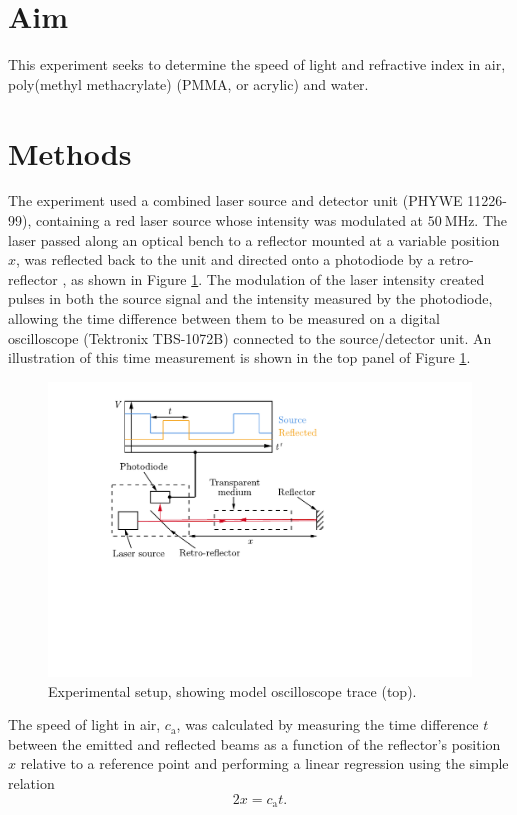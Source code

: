 \documentclass[
    aps,
    prl,
    reprint,
    10pt,
    amsmath,
    amssymb,
    a4paper,
    longbibliography
]{revtex4-2}
\begin{document}
\section{Aim}

This experiment seeks to determine the speed of light and refractive
index in air, poly(methyl methacrylate) (PMMA, or acrylic) and water.


\section{Methods}

The experiment used a combined laser source and detector unit
(PHYWE 11226-99), containing a red laser source whose intensity was
modulated at $\SI{50}{\mega\hertz}$. The laser passed along an optical
bench to a reflector mounted at a variable position $x$, was reflected
back to the unit and directed onto a photodiode by a retro-reflector
\cite{datasheet}, as shown in Figure \ref{setup}.
The modulation of the laser intensity created pulses in
both the source signal and the intensity measured by the photodiode,
allowing the time difference between them to be measured on a digital
oscilloscope (Tektronix TBS-1072B) connected to the source/detector
unit. An illustration of this time measurement is shown in the top
panel of Figure \ref{setup}.

\begin{figure}[ht]
    \centering
    \includegraphics[width=\linewidth]{setup_updated}
    \caption{Experimental setup, showing model oscilloscope trace (top).}
    \label{setup}
\end{figure}

The speed of light in air, $c_\mathrm{a}$, was calculated by measuring
the time difference $t$ between the emitted and reflected beams as a
function of the reflector's position $x$ relative to a reference
point and performing a linear regression using the simple relation
\begin{equation}
    2x = c_\mathrm{a} t.
    \label{air_eqn}
\end{equation}
\end{document}
